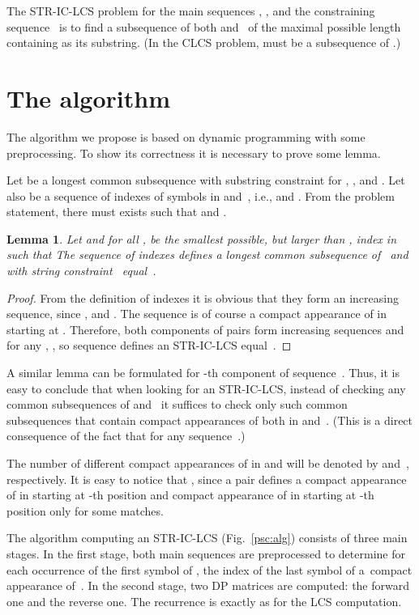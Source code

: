 \documentclass[12pt]{article}
\newtheorem{lemma}{Lemma}
\begin{document}
The STR-IC-LCS problem for the main sequences , , and the constraining sequence~ is to find a subsequence  of both  and~ of the maximal possible length containing  as its substring.
(In the CLCS problem,  must be a subsequence of .)


\section{The algorithm}
\label{sec:alg}
The algorithm we propose is based on dynamic programming with some preprocessing.
To show its correctness it is necessary to prove some lemma.

Let  be a longest common subsequence with substring constraint for , , and .
Let also  be a sequence of indexes of  symbols in  and~, i.e.,  and .
From the problem statement, there must exists such  that  and  .

\begin{lemma}\label{lem:i-prime}
Let  and for all ,  be the smallest possible, but larger than , index in  such that 
The sequence of indexes  defines a longest common subsequence of~ and~ with string constraint~ equal~.
\end{lemma}

\begin{proof}
From the definition of indexes  it is obvious that they form an increasing sequence, since , and .
The sequence  is of course a compact appearance of  in~ starting at .
Therefore, both components of  pairs form increasing sequences and for any , , so sequence  defines an STR-IC-LCS  equal~.
\end{proof}

A similar lemma can be formulated for -th component of sequence~.
Thus, it is easy to conclude that when looking for an STR-IC-LCS, instead of checking any common subsequences of  and~ it suffices to check only such common subsequences that contain compact appearances of  both in  and~.
(This is a direct consequence of the fact that  for any sequence~.)

The number of different compact appearances of  in  and  will be denoted by  and~, respectively.
It is easy to notice that , since a pair  defines a compact appearance of  in  starting at -th position and compact appearance of  in  starting at -th position only for some matches.

The algorithm computing an STR-IC-LCS (Fig.~\ref{psc:alg}) consists of three main stages.
In the first stage, both main sequences are preprocessed to determine for each occurrence of the first symbol of , the index of the last symbol of a~compact appearance of~.
In the second stage, two DP matrices are computed: the forward one and the reverse one.
The recurrence is exactly as for the LCS computation.
\end{document}
